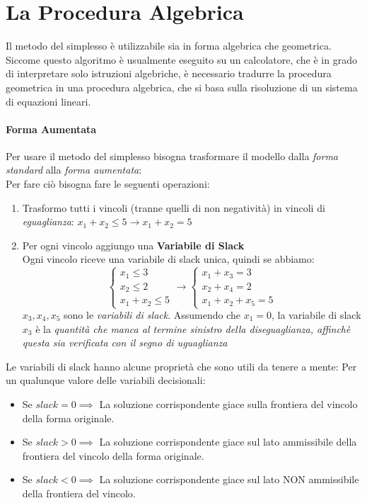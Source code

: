 \documentclass[12pt, a4paper, openany]{book}
\begin{document}
\section{La Procedura Algebrica}
Il metodo del simplesso è utilizzabile sia in forma algebrica che geometrica.
Siccome questo algoritmo è usualmente eseguito su un calcolatore, che è in grado di interpretare solo istruzioni algebriche,
è necessario tradurre la procedura geometrica in una procedura algebrica, che si basa sulla risoluzione di un sistema di equazioni lineari.
\paragraph*{Forma Aumentata}
Per usare il metodo del simplesso bisogna trasformare il modello dalla \emph{forma standard} alla \emph{forma aumentata}:
\\Per fare ciò bisogna fare le seguenti operazioni:
\begin{enumerate}
    \item Trasformo tutti i vincoli (tranne quelli di non negatività) in vincoli di \emph{eguaglianza}:
          $ x_1 +  x_2 \leq 5 \to  x_1 + x_2 = 5$
    \item Per ogni vincolo aggiungo una \textbf{Variabile di Slack}
          \\Ogni vincolo riceve una variabile di slack unica, quindi se abbiamo:
          \[
              \begin{cases}
                  x_1 \leq 3 \\
                  x_2 \leq 2 \\
                  x_1 + x_2 \leq 5
              \end{cases}
              \to
              \begin{cases}
                  x_1 + x_3 = 3 \\
                  x_2 + x_4= 2  \\
                  x_1 + x_2 + x_5 = 5
              \end{cases}
          \]
          $x_3,x_4,x_5$ sono le \emph{variabili di slack}.
          Assumendo che $x_1 = 0$, la variabile di slack $x_3$ è la \emph{quantità che manca al termine sinistro della diseguaglianza,
              affinchè questa sia verificata con il segno di uguaglianza }
\end{enumerate}
Le variabili di slack hanno alcune proprietà che sono utili da tenere a mente:
Per un qualunque valore delle variabili decisionali:
\begin{itemize}
    \item Se $slack = 0 \implies$ La soluzione corrispondente giace sulla frontiera del vincolo della forma originale.
    \item Se $slack > 0 \implies$ La soluzione corrispondente giace sul lato ammissibile della frontiera del vincolo della forma originale.
    \item Se $slack < 0 \implies$ La soluzione corrispondente giace sul lato NON ammissibile della frontiera del vincolo.
\end{itemize}
\end{document}
